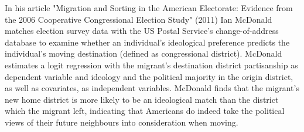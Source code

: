 \documentclass[12pt, a4paper]{article}
\begin{document}
\newline In his article "Migration and Sorting in the American Electorate: Evidence from the 2006 Cooperative Congressional Election Study" (2011) Ian McDonald matches election survey data with the US Postal Service's change-of-address database to examine whether an individual's ideological preference predicts the individual's moving destination (defined as congressional district). McDonald estimates a logit regression with the migrant's destination district partisanship as dependent variable and ideology and the political majority in the origin district, as well as covariates, as independent variables. McDonald finds that the migrant's new home district is more likely to be an ideological match than the district which the migrant left, indicating that Americans do indeed take the political views of their future neighbours into consideration when moving. 

\end{document}
